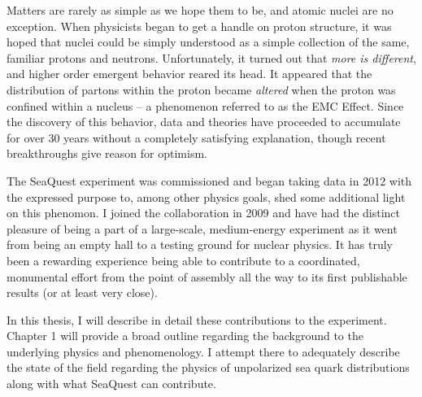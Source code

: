 \documentclass[edeposit,fullpage]{uiucthesis2009}
\begin{document}
Matters are rarely as simple as we hope them to be, and atomic nuclei are no exception. When physicists began to get a handle on proton structure, it was hoped that nuclei could be simply understood as a simple collection of the same, familiar protons and neutrons. Unfortunately, it turned out that \emph{more is different}, and higher order emergent behavior reared its head. It appeared that the distribution of partons within the proton became \emph{altered} when the proton was confined within a nucleus -- a phenomenon referred to as the EMC Effect. Since the discovery of this behavior, data and theories have proceeded to accumulate for over 30 years without a completely satisfying explanation, though recent breakthroughs give reason for optimism.

The SeaQuest experiment was commissioned and began taking data in 2012 with the expressed purpose to, among other physics goals, shed some additional light on this phenomon. I joined the collaboration in 2009 and have had the distinct pleasure of being a part of a large-scale, medium-energy experiment as it went from being an empty hall to a testing ground for nuclear physics. It has truly been a rewarding experience being able to contribute to a coordinated, monumental effort from the point of assembly all the way to its first publishable results (or at least very close).

In this thesis, I will describe in detail these contributions to the experiment. Chapter 1 will provide a broad outline regarding the background to the underlying physics and phenomenology. I attempt there to adequately describe the state of the field regarding the physics of unpolarized sea quark distributions along with what SeaQuest can contribute.



%
%





\appendix



\backmatter



\end{document}
